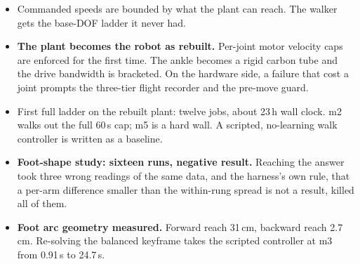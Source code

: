 \begin{itemize}[leftmargin=1.2cm,label={}]
  \item[\textbf{2026-08-09}] Commanded speeds are bounded by what the plant can reach. The walker
        gets the base-DOF ladder it never had.
  \item[\textbf{2026-08-10}] \textbf{The plant becomes the robot as rebuilt.} Per-joint motor
        velocity caps are enforced for the first time. The ankle becomes a rigid carbon tube and
        the drive bandwidth is bracketed. On the hardware side, a failure that cost a joint prompts
        the three-tier flight recorder and the pre-move guard.
  \item[\textbf{2026-08-11}] First full ladder on the rebuilt plant: twelve jobs, about 23\,h wall
        clock. m2 walks out the full 60\,s cap; m5 is a hard wall. A scripted, no-learning walk
        controller is written as a baseline.
  \item[\textbf{2026-08-19}] \textbf{Foot-shape study: sixteen runs, negative result.} Reaching the
        answer took three wrong readings of the same data, and the harness's own rule, that a
        per-arm difference smaller than the within-rung spread is not a result, killed all of them.
  \item[\textbf{2026-08-25}] \textbf{Foot arc geometry measured.} Forward reach 31\,cm, backward
        reach 2.7\,cm. Re-solving the balanced keyframe takes the scripted controller at m3 from
        0.91\,s to 24.7\,s.
\end{itemize}
